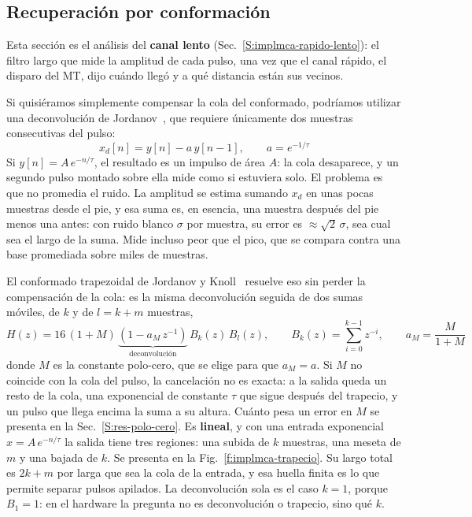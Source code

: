 \subsection{Recuperación por conformación}
\label{S:implmca-trapezoidal}

Esta sección es el análisis del \textbf{canal lento}
(Sec.~\ref{S:implmca-rapido-lento}): el filtro largo que mide la amplitud de
cada pulso, una vez que el canal rápido, el disparo del MT, dijo cuándo llegó y
a qué distancia están sus vecinos.

Si quisiéramos simplemente compensar la cola del conformado, podríamos utilizar
una deconvolución de Jordanov~\cite{Jordanov1994}, que requiere únicamente dos
muestras consecutivas del pulso:
\begin{equation}
  x_d[n] = y[n] - a\,y[n-1], \qquad a = e^{-1/\tau}
  \label{e:implmca-deconv}
\end{equation}
Si $y[n] = A\,e^{-n/\tau}$, el resultado es un impulso de área $A$: la cola
desaparece, y un segundo pulso montado sobre ella mide como si estuviera solo.
El problema es que no promedia el ruido. La amplitud se estima sumando $x_d$ en
unas pocas muestras desde el pie, y esa suma es, en esencia, una muestra después
del pie menos una antes: con ruido blanco $\sigma$ por muestra, su error es
$\approx \sqrt{2}\,\sigma$, sea cual sea el largo de la suma. Mide incluso peor
que el pico, que se compara contra una base promediada sobre miles de muestras.

El conformado trapezoidal de Jordanov y Knoll~\cite{Jordanov1994} resuelve eso
sin perder la compensación de la cola: es la misma deconvolución seguida de dos
sumas móviles, de $k$ y de $l = k+m$ muestras,
\begin{equation}
  H(z) = 16\,(1+M)\,\underbrace{\left(1 - a_M\,z^{-1}\right)}_{\text{deconvolución}}
  \,B_k(z)\,B_l(z), \qquad B_k(z) = \sum_{i=0}^{k-1} z^{-i}, \qquad
  a_M = \frac{M}{1+M}
  \label{e:implmca-trapecio}
\end{equation}
donde $M$ es la constante polo-cero, que se elige para que $a_M = a$. Si $M$ no coincide con la
cola del pulso, la cancelación no es exacta: a la salida queda un resto de la
cola, una exponencial de constante $\tau$ que sigue después del trapecio, y un
pulso que llega encima la suma a su altura. Cuánto pesa un error en $M$ se
presenta en la Sec.~\ref{S:res-polo-cero}. Es \textbf{lineal}, y con una entrada
exponencial $x = A\,e^{-n/\tau}$ la salida tiene tres regiones: una subida de
$k$ muestras, una meseta de $m$ y una bajada de $k$. Se presenta en la
Fig.~\ref{f:implmca-trapecio}. Su largo total es $2k+m$ por larga que sea la
cola de la entrada, y esa huella finita es lo que permite separar pulsos
apilados. La deconvolución sola es el caso $k = 1$, porque $B_1 = 1$: en el
hardware la pregunta no es deconvolución o trapecio, sino qué $k$.

